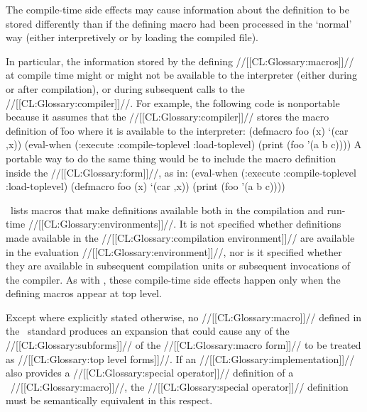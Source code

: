 The compile-time side effects may cause information about the definition to be stored differently than if the defining macro had been processed in the `normal' way (either interpretively or by loading the compiled file).

In particular, the information stored by the defining //[[CL:Glossary:macros]]// at compile time might or might not be available to the interpreter (either during or after compilation), or during subsequent calls to the //[[CL:Glossary:compiler]]//.  For example, the following code is nonportable because it assumes that the //[[CL:Glossary:compiler]]// stores the macro definition of \f{foo} where it is available to the interpreter:
     \code
 (defmacro foo (x) `(car ,x))
 (eval-when (:execute :compile-toplevel :load-toplevel)
   (print (foo '(a b c)))) \endcode
     A portable way to do the same thing would be to include the macro definition inside the  //[[CL:Glossary:form]]//, as in:
     \code
 (eval-when (:execute :compile-toplevel :load-toplevel)
   (defmacro foo (x) `(car ,x))
   (print (foo '(a b c)))) \endcode

\Thenextfigure\ lists macros that make definitions available both in the compilation and run-time //[[CL:Glossary:environments]]//. It is not specified whether definitions made available in the //[[CL:Glossary:compilation environment]]// are available in the evaluation //[[CL:Glossary:environment]]//, nor is it specified whether they are available in subsequent compilation units or subsequent invocations of the compiler.  As with , these compile-time side effects happen only when the defining macros appear at  top level.
     


\endsubsubsubsection%

 


Except where explicitly stated otherwise, no //[[CL:Glossary:macro]]// defined in the \clisp\ standard produces an expansion that could cause any of the //[[CL:Glossary:subforms]]// of the //[[CL:Glossary:macro form]]// to be treated as  //[[CL:Glossary:top level forms]]//.  If an //[[CL:Glossary:implementation]]// also provides a //[[CL:Glossary:special operator]]// definition of a \clisp\ //[[CL:Glossary:macro]]//,  the //[[CL:Glossary:special operator]]// definition must be semantically equivalent in this respect.

